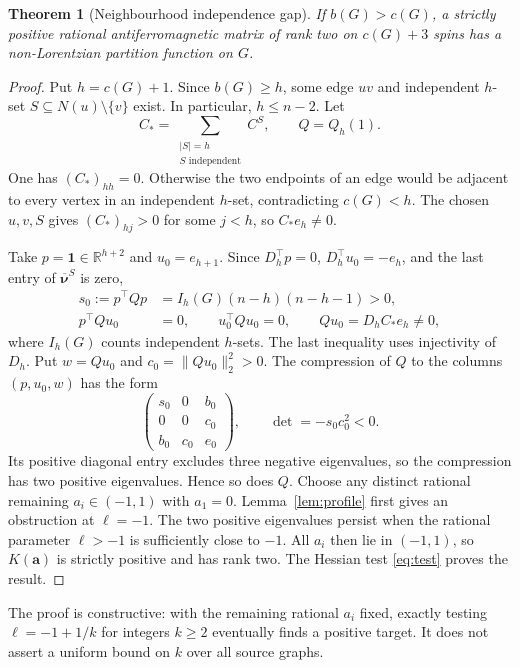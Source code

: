 \documentclass[11pt]{article}
\newtheorem{theorem}{Theorem}
\theoremstyle{remark}
\newcommand{\R}{\mathbb R}
\newcommand{\one}{\mathbf 1}
\newcommand{\bnu}{\boldsymbol{\nu}}
\begin{document}
\begin{theorem}[Neighbourhood independence gap]\label{thm:gap}
If $b(G)>c(G)$, a strictly positive rational antiferromagnetic
matrix of rank two on $c(G)+3$ spins has a non-Lorentzian partition
function on $G$.
\end{theorem}
\begin{proof}
Put $h=c(G)+1$. Since $b(G)\geq h$, some edge $uv$ and independent
$h$-set $S\subseteq N(u)\setminus\{v\}$ exist. In particular,
$h\leq n-2$. Let
\[
 C_* = \sum_{\substack{|S|=h\\S\text{ independent}}}C^S,
 \qquad Q=Q_h(1).
\]
One has $(C_*)_{hh}=0$. Otherwise the two endpoints of an edge
would be adjacent to every vertex in an independent $h$-set,
contradicting $c(G)<h$. The chosen $u,v,S$ gives
$(C_*)_{hj}>0$ for some $j<h$, so $C_*e_h\ne0$.

Take $p=\one\in\R^{h+2}$ and $u_0=e_{h+1}$. Since
$D_h^\top p=0$, $D_h^\top u_0=-e_h$, and the last entry of
$\overline{\bnu}^S$ is zero,
\begin{align}
 s_0:=p^\top Qp&=I_h(G)(n-h)(n-h-1)>0,\\
 p^\top Qu_0&=0,\qquad u_0^\top Qu_0=0,\qquad
 Qu_0=D_hC_*e_h\ne0,                                  \label{eq:gapnull}
\end{align}
where $I_h(G)$ counts independent $h$-sets. The last inequality
uses injectivity of $D_h$.
Put $w=Qu_0$ and $c_0=\|Qu_0\|_2^2>0$. The compression of $Q$
to the columns $(p,u_0,w)$ has the form
\[
 \begin{pmatrix}s_0&0&b_0\\0&0&c_0\\b_0&c_0&e_0\end{pmatrix},
 \qquad \det=-s_0c_0^2<0.
\]
Its positive diagonal entry excludes three negative eigenvalues,
so the compression has two positive eigenvalues. Hence so does $Q$.
Choose any distinct rational remaining $a_i\in(-1,1)$ with $a_1=0$.
Lemma~\ref{lem:profile} first gives an obstruction at $\ell=-1$.
The two positive eigenvalues persist when the rational parameter
$\ell>-1$ is sufficiently close to $-1$. All $a_i$ then lie in
$(-1,1)$, so $K(\mathbf a)$ is strictly positive and has rank two.
The Hessian test \eqref{eq:test} proves the result.
\end{proof}

The proof is constructive: with the remaining rational $a_i$ fixed,
exactly testing $\ell=-1+1/k$ for integers $k\geq2$ eventually
finds a positive target. It does not assert a uniform bound on $k$
over all source graphs.
\end{document}
